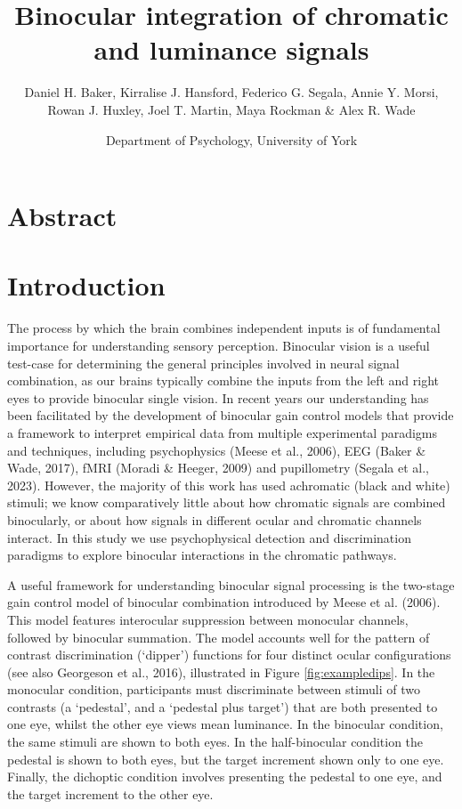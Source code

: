 \documentclass[
]{article}
\title{Binocular integration of chromatic and luminance signals}
\author{Daniel H. Baker, Kirralise J. Hansford, Federico G. Segala, Annie Y. Morsi,\\
Rowan J. Huxley, Joel T. Martin, Maya Rockman \& Alex R. Wade}
\date{Department of Psychology, University of York}
\begin{document}
\maketitle

\hypertarget{abstract}{%
\section{Abstract}\label{abstract}}

\hypertarget{introduction}{%
\section{Introduction}\label{introduction}}

The process by which the brain combines independent inputs is of fundamental importance for understanding sensory perception. Binocular vision is a useful test-case for determining the general principles involved in neural signal combination, as our brains typically combine the inputs from the left and right eyes to provide binocular single vision. In recent years our understanding has been facilitated by the development of binocular gain control models that provide a framework to interpret empirical data from multiple experimental paradigms and techniques, including psychophysics (Meese et al., 2006), EEG (Baker \& Wade, 2017), fMRI (Moradi \& Heeger, 2009) and pupillometry (Segala et al., 2023). However, the majority of this work has used achromatic (black and white) stimuli; we know comparatively little about how chromatic signals are combined binocularly, or about how signals in different ocular and chromatic channels interact. In this study we use psychophysical detection and discrimination paradigms to explore binocular interactions in the chromatic pathways.

A useful framework for understanding binocular signal processing is the two-stage gain control model of binocular combination introduced by Meese et al. (2006). This model features interocular suppression between monocular channels, followed by binocular summation. The model accounts well for the pattern of contrast discrimination (`dipper') functions for four distinct ocular configurations (see also Georgeson et al., 2016), illustrated in Figure \ref{fig:exampledips}. In the monocular condition, participants must discriminate between stimuli of two contrasts (a `pedestal', and a `pedestal plus target') that are both presented to one eye, whilst the other eye views mean luminance. In the binocular condition, the same stimuli are shown to both eyes. In the half-binocular condition the pedestal is shown to both eyes, but the target increment shown only to one eye. Finally, the dichoptic condition involves presenting the pedestal to one eye, and the target increment to the other eye.
\end{document}
